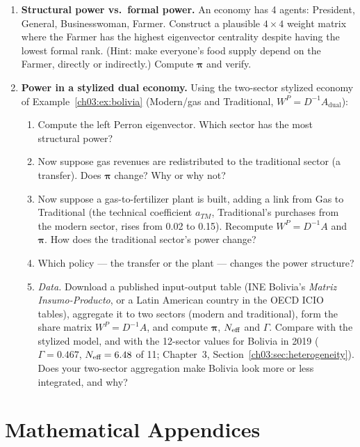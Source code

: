 \documentclass[../structural_economics_book.tex]{subfiles}
\begin{document}
\begin{enumerate}[label=\textbf{6.\arabic*}, leftmargin=3em]
\item \textbf{Structural power vs.\ formal power.} An economy has 4 agents: President, General, Businesswoman, Farmer. Construct a plausible $4 \times 4$ weight matrix where the Farmer has the highest eigenvector centrality despite having the lowest formal rank. (Hint: make everyone's food supply depend on the Farmer, directly or indirectly.) Compute $\boldsymbol{\pi}$ and verify.

\item \textbf{Power in a stylized dual economy.} Using the two-sector stylized economy of Example~\ref{ch03:ex:bolivia} (Modern/gas and Traditional, $W^P = D^{-1}A_{\text{dual}}$):
\begin{enumerate}
\item Compute the left Perron eigenvector. Which sector has the most structural power?
\item Now suppose gas revenues are redistributed to the traditional sector (a transfer). Does $\boldsymbol{\pi}$ change? Why or why not?
\item Now suppose a gas-to-fertilizer plant is built, adding a link from Gas to Traditional (the technical coefficient $a_{TM}$, Traditional's purchases from the modern sector, rises from 0.02 to 0.15). Recompute $W^P = D^{-1}A$ and $\boldsymbol{\pi}$. How does the traditional sector's power change?
\item Which policy --- the transfer or the plant --- changes the power structure?
\item \textit{Data.} Download a published input-output table (INE Bolivia's \textit{Matriz Insumo-Producto}, or a Latin American country in the OECD ICIO tables), aggregate it to two sectors (modern and traditional), form the share matrix $W^P = D^{-1}A$, and compute $\boldsymbol{\pi}$, $N_{\text{eff}}$ and $\Gamma$. Compare with the stylized model, and with the 12-sector values for Bolivia in 2019 ($\Gamma = 0.467$, $N_{\text{eff}} = 6.48$ of 11; Chapter~3, Section~\ref{ch03:sec:heterogeneity}). Does your two-sector aggregation make Bolivia look more or less integrated, and why?
\end{enumerate}

\end{enumerate}


\newpage
\section*{Mathematical Appendices}
\end{document}
